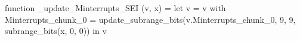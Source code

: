 function _update_Minterrupts_SEI (v, x) = let v = { v with Minterrupts_chunk_0 = update_subrange_bits(v.Minterrupts_chunk_0, 9, 9, subrange_bits(x, 0, 0)) } in
  v
